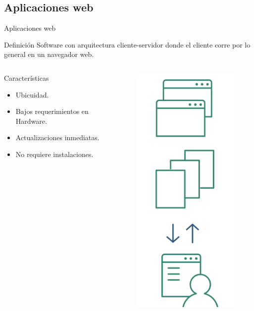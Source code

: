 \documentclass[10pt,xcolor=table ]{beamer}
\begin{document}
\subsection{Aplicaciones web}
\begin{frame}{Aplicaciones web}
	\begin{alertblock}{Definición}
		Software con arquitectura cliente-servidor donde el cliente corre por lo general en un navegador web.
	\end{alertblock}
	\begin{columns}[c,onlytextwidth]
		\begin{block}{Características}
			\begin{itemize}
	        	\item Ubicuidad.
	        	\item Bajos requerimientos en Hardware.
	        	\item Actualizaciones inmediatas.
	        	\item No requiere instalaciones.
	    	\end{itemize}
		\end{block}
		\begin{figure}[H]
			\includegraphics[scale=0.23]{../Figuras/web_app}
		\end{figure}
  	\end{columns}
\end{frame}
\end{document}
